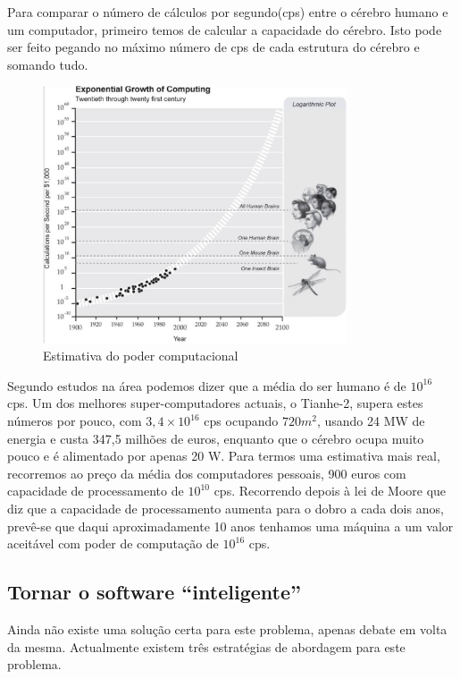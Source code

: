 \documentclass[runningheads,a4paper]{llncs}
\begin{document}
Para comparar o número de cálculos por segundo(cps) entre o cérebro humano e um computador, primeiro temos de calcular a capacidade do cérebro. Isto pode ser feito pegando no máximo número de cps de cada estrutura do cérebro e somando tudo.

\begin{figure}[ht!]
  \centering
  \includegraphics[width=90mm]{plot1.jpg}
  \caption{Estimativa do poder computacional\cite{lawar}\label{overflow}}
\end{figure}

Segundo estudos na área podemos dizer que a média do ser humano é de $10^{16}$ cps.
Um dos melhores super-computadores actuais, o Tianhe-2, supera estes números por pouco, com $3,4\times10^{16}$ cps ocupando $720 m^{2}$, usando 24 MW de energia e custa 347,5 milhões de euros, enquanto que o cérebro ocupa muito pouco e é alimentado por apenas 20 W.
Para termos uma estimativa mais real, recorremos ao preço da média dos computadores pessoais, 900 euros com capacidade de processamento de $10^{10}$ cps.
Recorrendo depois à lei de Moore que diz que a capacidade de processamento aumenta para o dobro a cada dois anos, prevê-se que daqui aproximadamente 10 anos tenhamos uma máquina a um valor aceitável com poder de computação de $10^{16}$ cps.

\subsection{Tornar o software “inteligente”}

Ainda não existe uma solução certa para este problema, apenas debate em volta da mesma. Actualmente existem três estratégias de abordagem para este problema.
\end{document}

